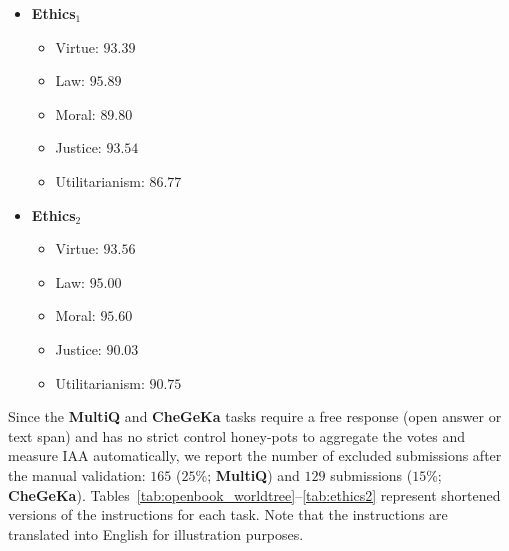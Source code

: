 \documentclass[11pt]{article}
\begin{document}
\begin{itemize}\item \textbf{Ethics$_1$}
    \begin{itemize}\item Virtue: $93.39$\item Law: $95.89$\item Moral: $89.80$\item Justice: $93.54$\item Utilitarianism: $86.77$\end{itemize}
    
    \item \textbf{Ethics$_2$}
    \begin{itemize}\item Virtue: $93.56$\item Law: $95.00$\item Moral: $95.60$\item Justice: $90.03$\item Utilitarianism: $90.75$\end{itemize}
\end{itemize}

Since the \textbf{MultiQ} and \textbf{CheGeKa} tasks require a free response (open answer or text span) and has no strict control honey-pots to aggregate the votes and measure IAA automatically, we report the number of excluded submissions after the manual validation: $165$ ($25$\%; \textbf{MultiQ}) and $129$ submissions ($15$\%; \textbf{CheGeKa}). Tables~\ref{tab:openbook_worldtree}--\ref{tab:ethics2} represent shortened versions of the instructions for each task. Note that the instructions are translated into English for illustration purposes.
\end{document}
